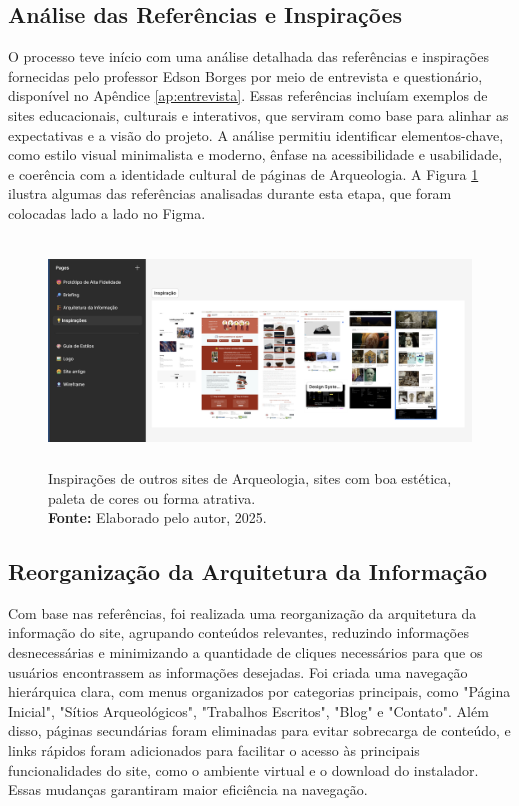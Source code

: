 \subsection{Análise das Referências e Inspirações}
O processo teve início com uma análise detalhada das referências e inspirações fornecidas pelo professor Edson Borges por meio de entrevista e questionário, disponível no Apêndice \ref{ap:entrevista}. Essas referências incluíam exemplos de sites educacionais, culturais e interativos, que serviram como base para alinhar as expectativas e a visão do projeto. A análise permitiu identificar elementos-chave, como estilo visual minimalista e moderno, ênfase na acessibilidade e usabilidade, e coerência com a identidade cultural de páginas de Arqueologia. A Figura \ref{fig:inpirações} ilustra algumas das referências analisadas durante esta etapa, que foram colocadas lado a lado no Figma.

\begin{figure}[H]
    \centering
    \includegraphics[height=6cm, keepaspectratio]{img/Protótipo/inspiração.png}
    \caption{ Inspirações de outros sites de Arqueologia, sites com boa estética, \\ paleta de cores ou forma atrativa. \\
        \textbf{Fonte:} Elaborado pelo autor, 2025.}
    \label{fig:inpirações}
\end{figure}

\subsection{Reorganização da Arquitetura da Informação}
Com base nas referências, foi realizada uma reorganização da arquitetura da informação do site, agrupando conteúdos relevantes, reduzindo informações desnecessárias e minimizando a quantidade de cliques necessários para que os usuários encontrassem as informações desejadas. Foi criada uma navegação hierárquica clara, com menus organizados por categorias principais, como "Página Inicial", "Sítios Arqueológicos", "Trabalhos Escritos", "Blog" e "Contato". Além disso, páginas secundárias foram eliminadas para evitar sobrecarga de conteúdo, e links rápidos foram adicionados para facilitar o acesso às principais funcionalidades do site, como o ambiente virtual e o download do instalador. Essas mudanças garantiram maior eficiência na navegação.

